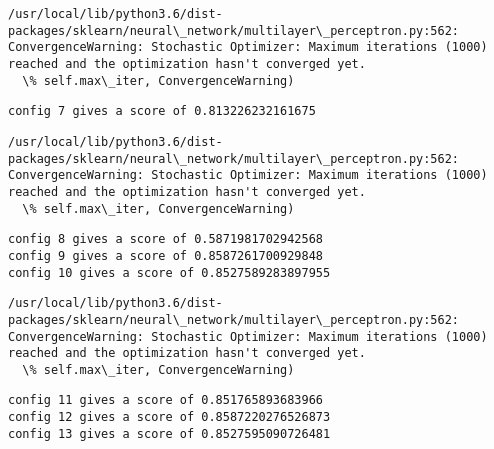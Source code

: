\documentclass[11pt]{article}
\begin{document}
    \begin{Verbatim}[commandchars=\\\{\}]
/usr/local/lib/python3.6/dist-packages/sklearn/neural\_network/multilayer\_perceptron.py:562: ConvergenceWarning: Stochastic Optimizer: Maximum iterations (1000) reached and the optimization hasn't converged yet.
  \% self.max\_iter, ConvergenceWarning)

    \end{Verbatim}

    \begin{Verbatim}[commandchars=\\\{\}]
config 7 gives a score of 0.813226232161675

    \end{Verbatim}

    \begin{Verbatim}[commandchars=\\\{\}]
/usr/local/lib/python3.6/dist-packages/sklearn/neural\_network/multilayer\_perceptron.py:562: ConvergenceWarning: Stochastic Optimizer: Maximum iterations (1000) reached and the optimization hasn't converged yet.
  \% self.max\_iter, ConvergenceWarning)

    \end{Verbatim}

    \begin{Verbatim}[commandchars=\\\{\}]
config 8 gives a score of 0.5871981702942568
config 9 gives a score of 0.8587261700929848
config 10 gives a score of 0.8527589283897955

    \end{Verbatim}

    \begin{Verbatim}[commandchars=\\\{\}]
/usr/local/lib/python3.6/dist-packages/sklearn/neural\_network/multilayer\_perceptron.py:562: ConvergenceWarning: Stochastic Optimizer: Maximum iterations (1000) reached and the optimization hasn't converged yet.
  \% self.max\_iter, ConvergenceWarning)

    \end{Verbatim}

    \begin{Verbatim}[commandchars=\\\{\}]
config 11 gives a score of 0.851765893683966
config 12 gives a score of 0.8587220276526873
config 13 gives a score of 0.8527595090726481

    \end{Verbatim}
\end{document}
